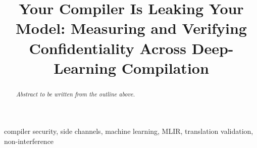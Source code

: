 \documentclass[conference]{IEEEtran}
\begin{document}
\title{Your Compiler Is Leaking Your Model: Measuring and Verifying
  Confidentiality Across Deep-Learning Compilation}

\author{
}

\maketitle

\begin{abstract}
\emph{Abstract to be written from the outline above.}
\end{abstract}

\begin{IEEEkeywords}
compiler security, side channels, machine learning, MLIR,
translation validation, non-interference
\end{IEEEkeywords}












\end{document}
